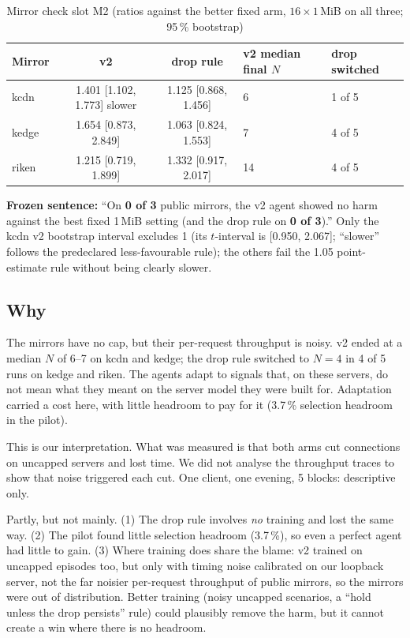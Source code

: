 \begin{table}[H]\centering\small
\caption{Mirror check slot M2 (ratios against the better fixed arm, $16\times1$\,MiB on all three; 95\,\% bootstrap)}\label{tab:mirror}
\begin{tabular}{@{}lccll@{}}
\toprule
\textbf{Mirror} & \textbf{v2} & \textbf{drop rule} & \textbf{v2 median final $N$} & \textbf{drop switched}\\
\midrule
kcdn & 1.401 [1.102, 1.773] slower & 1.125 [0.868, 1.456] & 6 & 1 of 5\\
kedge & 1.654 [0.873, 2.849] & 1.063 [0.824, 1.553] & 7 & 4 of 5\\
riken & 1.215 [0.719, 1.899] & 1.332 [0.917, 2.017] & 14 & 4 of 5\\
\bottomrule
\end{tabular}
\end{table}

\textbf{Frozen sentence:} ``On \textbf{0 of 3} public mirrors, the v2 agent showed no harm against the best fixed 1\,MiB setting (and the drop rule on \textbf{0 of 3}).'' Only the kcdn v2 bootstrap interval excludes 1 (its $t$-interval is [0.950, 2.067]; ``slower'' follows the predeclared less-favourable rule); the others fail the 1.05 point-estimate rule without being clearly slower.

\subsection{Why}
The mirrors have no cap, but their per-request throughput is noisy. v2 ended at a median $N$ of 6--7 on kcdn and kedge; the drop rule switched to $N=4$ in 4 of 5 runs on kedge and riken. The agents adapt to signals that, on these servers, do not mean what they meant on the server model they were built for. Adaptation carried a cost here, with little headroom to pay for it (3.7\,\% selection headroom in the pilot).

\begin{careful}
This is our interpretation. What was measured is that both arms cut connections on uncapped servers and lost time. We did not analyse the throughput traces to show that noise triggered each cut. One client, one evening, 5 blocks: descriptive only.
\end{careful}

\begin{doubt}
Partly, but not mainly. (1) The drop rule involves \emph{no} training and lost the same way. (2) The pilot found little selection headroom (3.7\,\%), so even a perfect agent had little to gain. (3) Where training does share the blame: v2 trained on uncapped episodes too, but only with timing noise calibrated on our loopback server, not the far noisier per-request throughput of public mirrors, so the mirrors were out of distribution. Better training (noisy uncapped scenarios, a ``hold unless the drop persists'' rule) could plausibly remove the harm, but it cannot create a win where there is no headroom.
\end{doubt}
